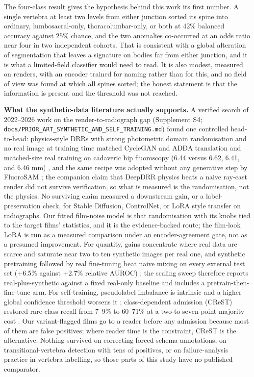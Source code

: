 \documentclass[11pt,letterpaper]{article}
\begin{document}
The four-class result gives the hypothesis behind this work its first number. A single vertebra at least two levels from either junction sorted its spine into ordinary, lumbosacral-only, thoracolumbar-only, or both at 42\% balanced accuracy against 25\% chance, and the two anomalies co-occurred at an odds ratio near four in two independent cohorts. That is consistent with a global alteration of segmentation that leaves a signature on bodies far from either junction, and it is what a limited-field classifier would need to read. It is also modest, measured on renders, with an encoder trained for naming rather than for this, and no field of view was found at which all spines sorted; the honest statement is that the information is present and the threshold was not reached.

\textbf{What the synthetic-data literature actually supports.} A verified search of 2022--2026 work on the render-to-radiograph gap (Supplement S4; \texttt{docs/PRIOR\_ART\_SYNTHETIC\_AND\_SELF\_TRAINING.md}) found one controlled head-to-head: physics-style DRRs with strong photometric domain randomisation and no real image at training time matched CycleGAN and ADDA translation and matched-size real training on cadaveric hip fluoroscopy (6.44 versus 6.62, 6.41, and 6.46 mm) \citep{synthex2023}, and the same recipe was adopted without any generative step by FluoroSAM \citep{fluorosam2025}; the companion claim that DeepDRR physics beats a naive ray-cast render did not survive verification, so what is measured is the randomisation, not the physics. No surviving claim measured a downstream gain, or a label-preservation check, for Stable Diffusion, ControlNet, or LoRA style transfer on radiographs. Our fitted film-noise model is that randomisation with its knobs tied to the target films' statistics, and it is the evidence-backed route; the film-look LoRA is run as a measured comparison under an encoder-agreement gate, not as a presumed improvement. For quantity, gains concentrate where real data are scarce and saturate near two to ten synthetic images per real one, and synthetic pretraining followed by real fine-tuning beat naive mixing on every external test set (+6.5\% against +2.7\% relative AUROC) \citep{roentgenv2}; the scaling sweep therefore reports real-plus-synthetic against a fixed real-only baseline and includes a pretrain-then-fine-tune arm. For self-training, pseudolabel imbalance is intrinsic and a higher global confidence threshold worsens it \citep{debiaspl}; class-dependent admission (CReST) restored rare-class recall from 7--9\% to 60--71\% at a two-to-seven-point majority cost \citep{crest2021}. Our variant-flagged films go to a reader before any admission because most of them are false positives; where reader time is the constraint, CReST is the alternative. Nothing survived on correcting forced-schema annotations, on transitional-vertebra detection with tens of positives, or on failure-analysis practice in vertebra labelling, so those parts of this study have no published comparator.
\end{document}
